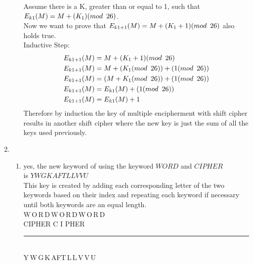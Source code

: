 \documentclass{assignment}
\newcommand*{\xdash}[1][3em]{\rule[0.5ex]{#1}{0.55pt}}
\begin{document}
\begin{problemlist}
\begin{problem}
\begin{answer}
\begin{enumerate}[label=(\alph*)]
\begin{enumerate}[label=(\roman*)]
				
				Assume there is a K, greater than or equal to 1, such that \\ $ E_{k1}(M) = M + (K_1) (mod \hspace{.5em} 26) $.\\ 
				Now we want to prove that $ E_{k1+1}(M) = M + (K_1+1) (mod \hspace{.5em} 26) $  also holds true. \\
				Inductive Step:
				\begin{align*}
					E_{k1+1}(M) &= M + (K_1+1)  (mod \hspace{.5em} 26) \\
					E_{k1+1}(M) &= M + (K_1 (mod \hspace{.5em} 26) ) + (1 (mod \hspace{.5em} 26) ) \\
					E_{k1+1}(M) &= ( M + K_1 (mod \hspace{.5em} 26) ) + (1 (mod \hspace{.5em} 26) ) \\
					E_{k1+1}(M) &= E_{k1}(M) + (1 (mod \hspace{.5em} 26) ) \\
					E_{k1+1}(M) &= E_{k1}(M) + 1
				\end{align*}
				Therefore by induction the key of multiple encipherment with shift cipher results in another shift cipher where the new key is just the sum of all the keys used previously.
			\end{enumerate}


	\item 	\begin{enumerate}[label=(\roman*)]
			\item yes, the new keyword of using the keyword $WORD$  and $CIPHER$ \\ is $YWGKAFTLLVVU$\\
			This key is created by adding each corresponding letter of the two keywords based on their index and repeating each keyword 
			if necessary until both keywords are an equal length. \\
		
			
			W\,O\,R\,D\,W\,O\,R\,D\,W\,O\,R\,D \\
			C\enspace I\enspace P\;H\;E\enspace R C I P\:H\;E\;R \\
			\xdash[12em] \\ 
			Y\,W\,G\,K\,A\enspace F\enspace T\,L\,L\,V\,V\,U
			
			



\end{enumerate}
\end{enumerate}
\end{answer}
\end{problem}
\end{problemlist}
\end{document}
